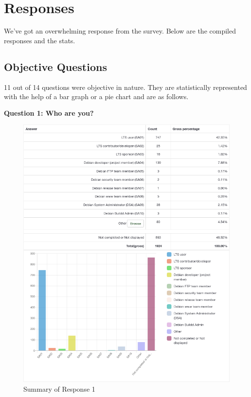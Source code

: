 \documentclass{article}
\begin{document}
\vspace{3mm}
\section{Responses}

\vspace{3mm}
We've got an overwhelming response from the survey. Below are the compiled responses and the stats.

\vspace{3mm}
\subsection{Objective Questions}

\vspace{3mm}
11 out of 14 questions were objective in nature. They are statistically represented with the help
of a bar graph or a pie chart and are as follows.

\newpage

\Large{\textbf{Question 1: Who are you?}}

\vspace{3mm}
\begin{figure}[h!]
\centering
\includegraphics[width=16.9cm]{assets/1-summary.png}
\caption{Summary of Response 1}
\end{figure}
\end{document}
